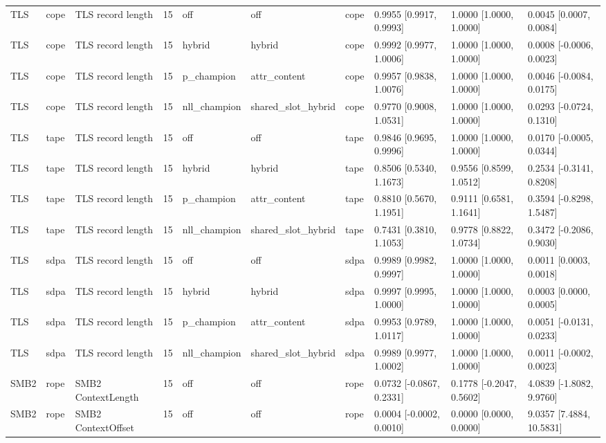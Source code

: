 \begin{tabular}{llllllllll}
TLS & cope & TLS record length & 15 & off & off & cope & 0.9955 [0.9917, 0.9993] & 1.0000 [1.0000, 1.0000] & 0.0045 [0.0007, 0.0084] \\
TLS & cope & TLS record length & 15 & hybrid & hybrid & cope & 0.9992 [0.9977, 1.0006] & 1.0000 [1.0000, 1.0000] & 0.0008 [-0.0006, 0.0023] \\
TLS & cope & TLS record length & 15 & p\_champion & attr\_content & cope & 0.9957 [0.9838, 1.0076] & 1.0000 [1.0000, 1.0000] & 0.0046 [-0.0084, 0.0175] \\
TLS & cope & TLS record length & 15 & nll\_champion & shared\_slot\_hybrid & cope & 0.9770 [0.9008, 1.0531] & 1.0000 [1.0000, 1.0000] & 0.0293 [-0.0724, 0.1310] \\
TLS & tape & TLS record length & 15 & off & off & tape & 0.9846 [0.9695, 0.9996] & 1.0000 [1.0000, 1.0000] & 0.0170 [-0.0005, 0.0344] \\
TLS & tape & TLS record length & 15 & hybrid & hybrid & tape & 0.8506 [0.5340, 1.1673] & 0.9556 [0.8599, 1.0512] & 0.2534 [-0.3141, 0.8208] \\
TLS & tape & TLS record length & 15 & p\_champion & attr\_content & tape & 0.8810 [0.5670, 1.1951] & 0.9111 [0.6581, 1.1641] & 0.3594 [-0.8298, 1.5487] \\
TLS & tape & TLS record length & 15 & nll\_champion & shared\_slot\_hybrid & tape & 0.7431 [0.3810, 1.1053] & 0.9778 [0.8822, 1.0734] & 0.3472 [-0.2086, 0.9030] \\
TLS & sdpa & TLS record length & 15 & off & off & sdpa & 0.9989 [0.9982, 0.9997] & 1.0000 [1.0000, 1.0000] & 0.0011 [0.0003, 0.0018] \\
TLS & sdpa & TLS record length & 15 & hybrid & hybrid & sdpa & 0.9997 [0.9995, 1.0000] & 1.0000 [1.0000, 1.0000] & 0.0003 [0.0000, 0.0005] \\
TLS & sdpa & TLS record length & 15 & p\_champion & attr\_content & sdpa & 0.9953 [0.9789, 1.0117] & 1.0000 [1.0000, 1.0000] & 0.0051 [-0.0131, 0.0233] \\
TLS & sdpa & TLS record length & 15 & nll\_champion & shared\_slot\_hybrid & sdpa & 0.9989 [0.9977, 1.0002] & 1.0000 [1.0000, 1.0000] & 0.0011 [-0.0002, 0.0023] \\
SMB2 & rope & SMB2 ContextLength & 15 & off & off & rope & 0.0732 [-0.0867, 0.2331] & 0.1778 [-0.2047, 0.5602] & 4.0839 [-1.8082, 9.9760] \\
SMB2 & rope & SMB2 ContextOffset & 15 & off & off & rope & 0.0004 [-0.0002, 0.0010] & 0.0000 [0.0000, 0.0000] & 9.0357 [7.4884, 10.5831] \\

\end{tabular}
